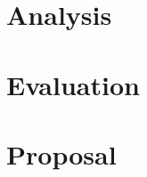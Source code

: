 \documentclass[a4paper]{report}
\begin{document}
\chapter{Analysis}
\label{analysis}



\chapter{Evaluation}

\appendix
\chapter{Proposal}





\end{document}

